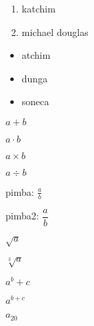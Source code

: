 \documentclass[a4paper, 12pt]{article}
\begin{document}
\begin{enumerate}
	\item katchim
	\item michael douglas
\end{enumerate}

\begin{itemize}
	\item atchim
	\item dunga
	\item soneca
\end{itemize}

$a + b$

$a \cdot b$

$a \times b$

$a \div b$

pimba: $\frac{a}{b}$

pimba2: $\dfrac{a}{b}$

$\sqrt{a}$

$\sqrt[3]{a}$

$a^b + c$

$a^{b+c}$

$a_{20}$
\end{document}
